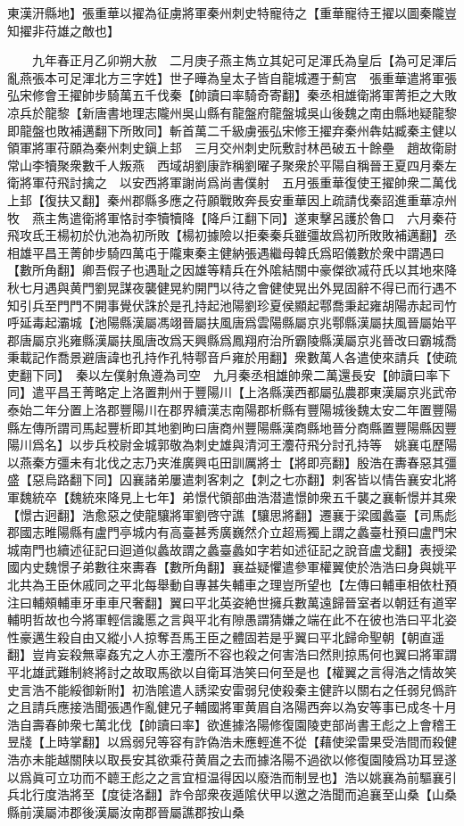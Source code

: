 東漢汧縣地】張重華以擢為征虜將軍秦州刺史特寵待之【重華寵待王擢以圖秦隴豈知擢非苻雄之敵也】

　　九年春正月乙卯朔大赦　二月庚子燕主雋立其妃可足渾氏為皇后【為可足渾后亂燕張本可足渾北方三字姓】世子曄為皇太子皆自龍城遷于薊宫　張重華遣將軍張弘宋修會王擢帥步騎萬五千伐秦【帥讀曰率騎奇寄翻】秦丞相雄衛將軍菁拒之大敗凉兵於龍黎【新唐書地理志隴州吳山縣有龍盤府龍盤城吳山後魏之南由縣地疑龍黎即龍盤也敗補邁翻下所敗同】斬首萬二千級虜張弘宋修王擢弃秦州犇姑臧秦主健以領軍將軍苻願為秦州刺史鎭上邽　三月交州刺史阮敷討林邑破五十餘壘　趙故衛尉常山李犢聚衆數千人叛燕　西域胡劉康詐稱劉曜子聚衆於平陽自稱晉王夏四月秦左衛將軍苻飛討擒之　以安西將軍謝尚爲尚書僕射　五月張重華復使王擢帥衆二萬伐上邽【復扶又翻】秦州郡縣多應之苻願戰敗奔長安重華因上疏請伐秦詔進重華凉州牧　燕主雋遣衛將軍恪討李犢犢降【降戶江翻下同】遂東擊呂護於魯口　六月秦苻飛攻氐王楊初於仇池為初所敗【楊初據險以拒秦秦兵雖彊故爲初所敗敗補邁翻】丞相雄平昌王菁帥步騎四萬屯于隴東秦主健納張遇繼母韓氏爲昭儀數於衆中謂遇曰【數所角翻】卿吾假子也遇耻之因雄等精兵在外隂結關中豪傑欲㓕苻氏以其地來降秋七月遇與黄門劉晃謀夜襲健晃約開門以待之會健使晃出外晃固辭不得已而行遇不知引兵至門門不開事覺伏誅於是孔持起池陽劉珍夏侯顯起鄠喬秉起雍胡陽赤起司竹呼延毒起灞城【池陽縣漢屬馮翊晉屬扶風唐爲雲陽縣屬京兆鄠縣漢屬扶風晉屬始平郡唐屬京兆雍縣漢屬扶風唐改爲天興縣爲鳳翔府治所霸陵縣漢屬京兆晉改曰霸城喬秉載記作喬景避唐諱也孔持作孔特鄠音戶雍於用翻】衆數萬人各遣使來請兵【使疏吏翻下同】　秦以左僕射魚遵為司空　九月秦丞相雄帥衆二萬還長安【帥讀曰率下同】遣平昌王菁略定上洛置荆州于豐陽川【上洛縣漢西都屬弘農郡東漢屬京兆武帝泰始二年分置上洛郡豐陽川在郡界續漢志南陽郡析縣有豐陽城後魏太安二年置豐陽縣左傳所謂司馬起豐析即其地劉昫曰唐商州豐陽縣漢商縣地晉分商縣置豐陽縣因豐陽川爲名】以步兵校尉金城郭敬為刺史雄與清河王灋苻飛分討孔持等　姚襄屯歷陽以燕秦方彊未有北伐之志乃夹淮廣興屯田訓厲將士【將即亮翻】殷浩在夀春惡其彊盛【惡烏路翻下同】囚襄諸弟屢遣刺客刺之【刺之七亦翻】刺客皆以情告襄安北將軍魏統卒【魏統來降見上七年】弟憬代領部曲浩潜遣憬帥衆五千襲之襄斬憬并其衆【憬古迥翻】浩愈惡之使龍驤將軍劉啓守譙【驤思將翻】遷襄于梁國蠡臺【司馬彪郡國志睢陽縣有盧門亭城内有高臺甚秀廣巍然介立超焉獨上謂之蠡臺杜預曰盧門宋城南門也續述征記曰迴道似蠡故謂之蠡臺蠡如字若如述征記之說音盧戈翻】表授梁國内史魏憬子弟數往來夀春【數所角翻】襄益疑懼遣參軍權翼使於浩浩曰身與姚平北共為王臣休戚同之平北每舉動自專甚失輔車之理豈所望也【左傳曰輔車相依杜預注曰輔頰輔車牙車車尺奢翻】翼曰平北英姿絶世擁兵數萬遠歸晉室者以朝廷有道宰輔明哲故也今將軍輕信讒慝之言與平北有隙愚謂猜嫌之端在此不在彼也浩曰平北姿性豪邁生殺自由又縱小人掠奪吾馬王臣之體固若是乎翼曰平北歸命聖朝【朝直遥翻】豈肯妄殺無辜姦宄之人亦王灋所不容也殺之何害浩曰然則掠馬何也翼曰將軍謂平北雄武難制終將討之故取馬欲以自衛耳浩笑曰何至是也【權翼之言得浩之情故笑史言浩不能綏御新附】初浩隂遣人誘梁安雷弱兒使殺秦主健許以關右之任弱兒僞許之且請兵應接浩聞張遇作亂健兄子輔國將軍黄眉自洛陽西奔以為安等事已成冬十月浩自壽春帥衆七萬北伐【帥讀曰率】欲進據洛陽修復園陵吏部尚書王彪之上會稽王昱牋【上時掌翻】以爲弱兒等容有詐偽浩未應輕進不從【藉使梁雷果受浩間而殺健浩亦未能越關陕以取長安其欲乘苻黄眉之去而據洛陽不過欲以修復園陵爲功耳昱遂以爲眞可立功而不聼王彪之之言宜桓温得因以廢浩而制昱也】浩以姚襄為前驅襄引兵北行度浩將至【度徒洛翻】詐令部衆夜遁隂伏甲以邀之浩聞而追襄至山桑【山桑縣前漢屬沛郡後漢屬汝南郡晉屬譙郡按山桑